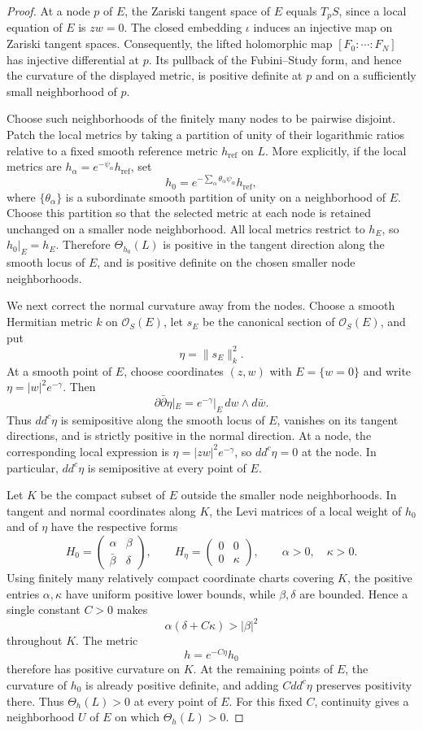 \documentclass[11pt]{amsart}
\theoremstyle{definition}
\theoremstyle{remark}
\numberwithin{equation}{section}
\newcommand{\OO}{\mathcal O}
\newcommand{\ddc}{dd^c}
\newcommand{\barp}{\bar\partial}
\begin{document}
\begin{proof}
At a node $p$ of $E$, the Zariski tangent space of $E$ equals
$T_pS$, since a local equation of $E$ is $zw=0$.
The closed embedding $\iota$ induces an injective map on
Zariski tangent spaces. Consequently, the lifted holomorphic
map $[F_0:\cdots:F_N]$ has injective differential at $p$.
Its pullback of the Fubini--Study form, and hence the curvature
of the displayed metric, is positive definite at $p$ and on
a sufficiently small neighborhood of $p$.

Choose such neighborhoods of the finitely many nodes to be
pairwise disjoint. Patch the local metrics by taking a
partition of unity of their logarithmic ratios relative to
a fixed smooth reference metric $h_{\mathrm{ref}}$ on $L$.
More explicitly, if the local metrics are
$h_\alpha=e^{-\psi_\alpha}h_{\mathrm{ref}}$, set
\[
 h_0=
 e^{-\sum_\alpha\theta_\alpha\psi_\alpha}
 h_{\mathrm{ref}},
\]
where $\{\theta_\alpha\}$ is a subordinate smooth partition
of unity on a neighborhood of $E$. Choose this partition so
that the selected metric at each node is retained unchanged
on a smaller node neighborhood. All local metrics restrict
to $h_E$, so $h_0|_E=h_E$. Therefore $\Theta_{h_0}(L)$ is
positive in the tangent direction along the smooth locus of
$E$, and is positive definite on the chosen smaller node
neighborhoods.

We next correct the normal curvature away from the nodes.
Choose a smooth Hermitian metric $k$ on $\OO_S(E)$, let $s_E$
be the canonical section of $\OO_S(E)$, and put
\[
 \eta=\|s_E\|_k^2.
\]
At a smooth point of $E$, choose coordinates $(z,w)$ with
$E=\{w=0\}$ and write $\eta=|w|^2e^{-\gamma}$. Then
\[
 \partial\barp\eta|_E
 =e^{-\gamma}|_E\,dw\wedge d\bar w.
\]
Thus $\ddc\eta$ is semipositive along the smooth locus of $E$,
vanishes on its tangent directions, and is strictly positive
in the normal direction. At a node, the corresponding local
expression is $\eta=|zw|^2e^{-\gamma}$, so $\ddc\eta=0$
at the node. In particular, $\ddc\eta$ is semipositive at
every point of $E$.

Let $K$ be the compact subset of $E$ outside the smaller node
neighborhoods. In tangent and normal coordinates along $K$,
the Levi matrices of a local weight of $h_0$ and of $\eta$
have the respective forms
\[
 H_0=
 \begin{pmatrix}\alpha&\beta\\\bar\beta&\delta\end{pmatrix},
 \qquad
 H_\eta=
 \begin{pmatrix}0&0\\0&\kappa\end{pmatrix},
 \qquad \alpha>0,\quad\kappa>0.
\]
Using finitely many relatively compact coordinate charts
covering $K$, the positive entries $\alpha,\kappa$ have
uniform positive lower bounds, while $\beta,\delta$ are
bounded. Hence a single constant $C>0$ makes
\[
 \alpha(\delta+C\kappa)>|\beta|^2
\]
throughout $K$. The metric
\[
 h=e^{-C\eta}h_0
\]
therefore has positive curvature on $K$.
At the remaining points of $E$, the curvature of $h_0$ is
already positive definite, and adding $C\ddc\eta$ preserves
positivity there. Thus $\Theta_h(L)>0$ at every point of $E$.
For this fixed $C$, continuity gives a neighborhood $U$ of
$E$ on which $\Theta_h(L)>0$.


\end{proof}
\end{document}
